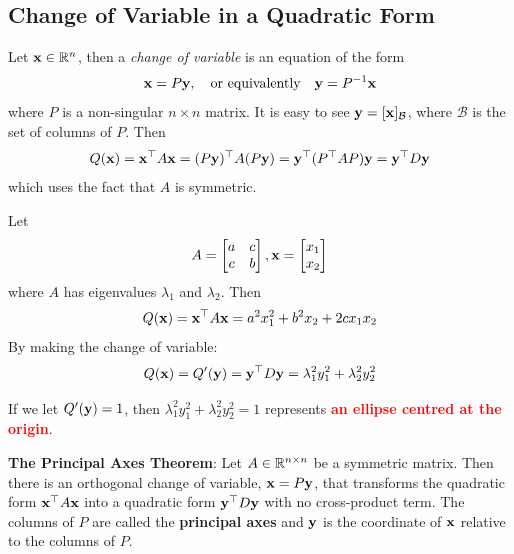     \subsection{Change of Variable in a Quadratic Form}
    Let $\mathbf{x}\in\mathbb{R}^n$, then a \textit{change of variable} is an equation of the form
    \begin{equation*}
        \mathbf{x} = P\mathbf{y},\quad \text{or equivalently} \quad \mathbf{y} = P^{-1}\mathbf{x}
    \end{equation*}
    where $P$ is a non-singular $n\times n$ matrix. It is easy to see $\mathbf{y} = [\mathbf{x}]_{\mathcal{B}}$, where $\mathcal{B}$ is the set of columns of $P$. Then
    \begin{equation}
        Q(\mathbf{x}) = \mathbf{x}^{\top}A\mathbf{x} = (P\mathbf{y})^{\top} A(P\mathbf{y}) = \mathbf{y}^{\top}(P^{\top}AP)\mathbf{y} = \mathbf{y}^{\top}D\mathbf{y}
    \end{equation}
    which uses the fact that $A$ is symmetric.
    \begin{Ex}
        Let
        \begin{equation*}
            A = \begin{bmatrix}
                a & c\\
                c & b
            \end{bmatrix}, \mathbf{x} = \begin{bmatrix}
                x_1\\
                x_2
            \end{bmatrix}
        \end{equation*}
        where $A$ has eigenvalues $\lambda_1$ and $\lambda_2$. Then
        \begin{equation*}
            Q(\mathbf{x}) = \mathbf{x}^{\top}A\mathbf{x} = a^2x_1^2 + b^2x_2 + 2cx_1x_2
        \end{equation*}
        By making the change of variable:
        \begin{equation}\label{change-of-variable}
            Q(\mathbf{x}) = Q'(\mathbf{y}) = \mathbf{y}^{\top}D\mathbf{y} =  \lambda_1^2y_1^2 + \lambda_2^2y_2^2
        \end{equation}
        \begin{Rem}
            If we let $Q'(\mathbf{y}) = 1$, then $\lambda_1^2y_1^2 + \lambda_2^2y_2^2 = 1$ represents \textbf{\textcolor{red} {an ellipse centred at the origin}}.
        \end{Rem}
    \end{Ex}
    \begin{Thm}
        \textbf{The Principal Axes Theorem}:
        Let $A\in\mathbb{R}^{n\times n}$ be a symmetric matrix. Then there is an orthogonal change of variable, $\mathbf{x} = P\mathbf{y}$, that transforms the quadratic form $\mathbf{x}^{\top}A\mathbf{x}$ into a quadratic form $\mathbf{y}^{\top}D\mathbf{y}$ with no cross-product term. The columns of $P$ are called the \textbf{principal axes} and $\mathbf{y}$ is the coordinate of $\mathbf{x}$ relative to the columns of $P$.
    \end{Thm}
